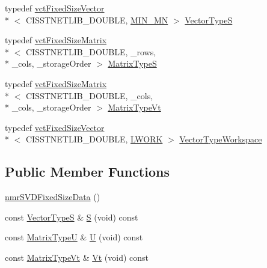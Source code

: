 \begin{DoxyCompactItemize}
\item 
typedef \hyperlink{classvct_fixed_size_vector}{vct\-Fixed\-Size\-Vector}\\*
$<$ C\-I\-S\-S\-T\-N\-E\-T\-L\-I\-B\-\_\-\-D\-O\-U\-B\-L\-E, \hyperlink{classnmr_s_v_d_fixed_size_data_a2ef10a687cdcc36a623139f9f2aa6301aded94c86f27589c19e93b3c9931b323f}{M\-I\-N\-\_\-\-M\-N} $>$ \hyperlink{classnmr_s_v_d_fixed_size_data_ad9ec4977d4726118af8c7bce3d18b752}{Vector\-Type\-S}
\item 
typedef \hyperlink{classvct_fixed_size_matrix}{vct\-Fixed\-Size\-Matrix}\\*
$<$ C\-I\-S\-S\-T\-N\-E\-T\-L\-I\-B\-\_\-\-D\-O\-U\-B\-L\-E, \-\_\-rows, \\*
\-\_\-cols, \-\_\-storage\-Order $>$ \hyperlink{classnmr_s_v_d_fixed_size_data_a4abee9caa16efd9bed6df1b4deec9207}{Matrix\-Type\-S}
\item 
typedef \hyperlink{classvct_fixed_size_matrix}{vct\-Fixed\-Size\-Matrix}\\*
$<$ C\-I\-S\-S\-T\-N\-E\-T\-L\-I\-B\-\_\-\-D\-O\-U\-B\-L\-E, \-\_\-cols, \\*
\-\_\-cols, \-\_\-storage\-Order $>$ \hyperlink{classnmr_s_v_d_fixed_size_data_ab9a7c396f7a83256d5e8c789b3a23591}{Matrix\-Type\-Vt}
\item 
typedef \hyperlink{classvct_fixed_size_vector}{vct\-Fixed\-Size\-Vector}\\*
$<$ C\-I\-S\-S\-T\-N\-E\-T\-L\-I\-B\-\_\-\-D\-O\-U\-B\-L\-E, \hyperlink{classnmr_s_v_d_fixed_size_data_ab47ccf635561f3a974f32ccac2a18aefad2d7db4b5640d7d880013bf89de1b1f8}{L\-W\-O\-R\-K} $>$ \hyperlink{classnmr_s_v_d_fixed_size_data_a82162baa88dba7eb39bb52b71435aaa9}{Vector\-Type\-Workspace}
\end{DoxyCompactItemize}
\subsection*{Public Member Functions}
\begin{DoxyCompactItemize}
\item 
\hyperlink{classnmr_s_v_d_fixed_size_data_a9a3e8861525d0c637ffd421077f91204}{nmr\-S\-V\-D\-Fixed\-Size\-Data} ()
\item 
const \hyperlink{classnmr_s_v_d_fixed_size_data_ad9ec4977d4726118af8c7bce3d18b752}{Vector\-Type\-S} \& \hyperlink{classnmr_s_v_d_fixed_size_data_a5b2e4ab7bced634221437feb8553a97c}{S} (void) const 
\item 
const \hyperlink{classnmr_s_v_d_fixed_size_data_a164bbc8eccf8b1102d5a85dde45de99d}{Matrix\-Type\-U} \& \hyperlink{classnmr_s_v_d_fixed_size_data_a8d10145c71076f4a4c833dd7a99b2416}{U} (void) const 
\item 
const \hyperlink{classnmr_s_v_d_fixed_size_data_ab9a7c396f7a83256d5e8c789b3a23591}{Matrix\-Type\-Vt} \& \hyperlink{classnmr_s_v_d_fixed_size_data_a352a18030d7a61640c263a1222618330}{Vt} (void) const 
\end{DoxyCompactItemize}

